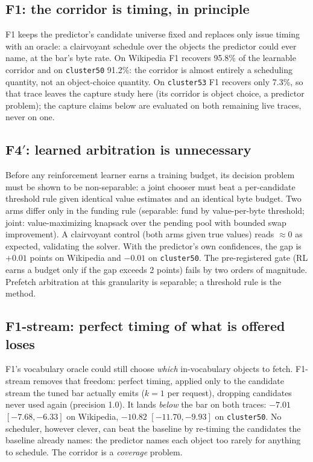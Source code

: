 \documentclass[11pt]{article}
\begin{document}
\subsection{F1: the corridor is timing, in principle}\label{sec:f1}
F1 keeps the predictor's candidate universe fixed and replaces only issue timing with an oracle: a clairvoyant schedule over the objects the predictor could ever name, at the bar's byte rate. On Wikipedia F1 recovers 95.8\% of the learnable corridor and on \texttt{cluster50} 91.2\%: the corridor is almost entirely a scheduling quantity, not an object-choice quantity. On \texttt{cluster53} F1 recovers only 7.3\%, so that trace leaves the capture study here (its corridor is object choice, a predictor problem); the capture claims below are evaluated on both remaining live traces, never on one.

\subsection{F4$'$: learned arbitration is unnecessary}\label{sec:f4}
Before any reinforcement learner earns a training budget, its decision problem must be shown to be non-separable: a joint chooser must beat a per-candidate threshold rule given identical value estimates and an identical byte budget. Two arms differ only in the funding rule (separable: fund by value-per-byte threshold; joint: value-maximizing knapsack over the pending pool with bounded swap improvement). A clairvoyant control (both arms given true values) reads $\approx0$ as expected, validating the solver. With the predictor's own confidences, the gap is $+0.01$ points on Wikipedia and $-0.01$ on \texttt{cluster50}. The pre-registered gate (RL earns a budget only if the gap exceeds 2 points) fails by two orders of magnitude. Prefetch arbitration at this granularity is separable; a threshold rule is the method.

\subsection{F1-stream: perfect timing of what is offered loses}\label{sec:f1stream}
F1's vocabulary oracle could still choose \emph{which} in-vocabulary objects to fetch. F1-stream removes that freedom: perfect timing, applied only to the candidate stream the tuned bar actually emits ($k{=}1$ per request), dropping candidates never used again (precision 1.0). It lands \emph{below} the bar on both traces: $-7.01$ $[-7.68,-6.33]$ on Wikipedia, $-10.82$ $[-11.70,-9.93]$ on \texttt{cluster50}. No scheduler, however clever, can beat the baseline by re-timing the candidates the baseline already names: the predictor names each object too rarely for anything to schedule. The corridor is a \emph{coverage} problem.
\end{document}
